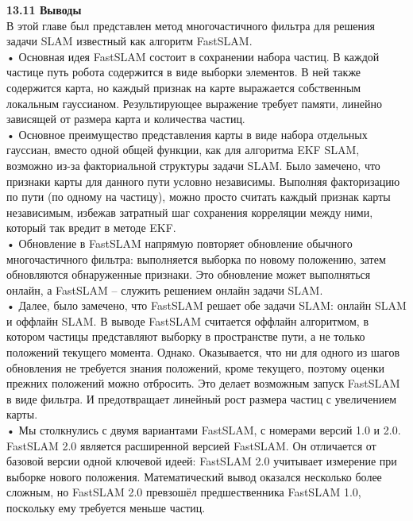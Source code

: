 \documentclass[10pt,a4paper]{article}
\begin{document}
\textbf{13.11	Выводы}\\

В этой главе был представлен метод многочастичного фильтра для решения задачи SLAM известный как алгоритм FastSLAM.\\

•	Основная идея FastSLAM состоит в сохранении набора частиц. В каждой частице путь робота содержится в виде выборки элементов. В ней также содержится карта, но каждый признак на карте выражается собственным локальным гауссианом. Результирующее выражение требует памяти, линейно зависящей от размера карта и количества частиц.\\

•	Основное преимущество представления карты в виде набора отдельных гауссиан, вместо одной общей функции, как для алгоритма EKF SLAM, возможно из-за факториальной структуры задачи SLAM. Было замечено, что признаки карты для данного пути условно независимы. Выполняя факторизацию по пути (по одному на частицу), можно просто считать каждый признак карты независимым, избежав затратный шаг сохранения корреляции между ними, который так вредит в методе EKF.\\

•	Обновление в FastSLAM напрямую повторяет обновление обычного многочастичного фильтра: выполняется выборка по новому положению, затем обновляются обнаруженные признаки. Это обновление может выполняться онлайн, а FastSLAM – служить решением онлайн задачи SLAM.\\

•	Далее, было замечено, что FastSLAM решает обе задачи SLAM: онлайн SLAM и оффлайн SLAM. В выводе FastSLAM считается оффлайн алгоритмом, в котором частицы представляют выборку в пространстве пути, а не только положений текущего момента. Однако. Оказывается, что ни для одного из шагов обновления не требуется знания положений, кроме текущего, поэтому оценки прежних положений можно отбросить. Это делает возможным запуск FastSLAM в виде фильтра. И предотвращает линейный рост размера частиц с увеличением карты.\\

•	Мы столкнулись с двумя вариантами FastSLAM, с номерами версий 1.0 и 2.0. FastSLAM 2.0 является расширенной версией FastSLAM. Он отличается от базовой версии одной ключевой идеей: FastSLAM 2.0 учитывает измерение при выборке нового положения. Математический вывод оказался несколько более сложным, но FastSLAM 2.0 превзошёл предшественника FastSLAM 1.0, поскольку ему требуется меньше частиц.\\
\end{document}
